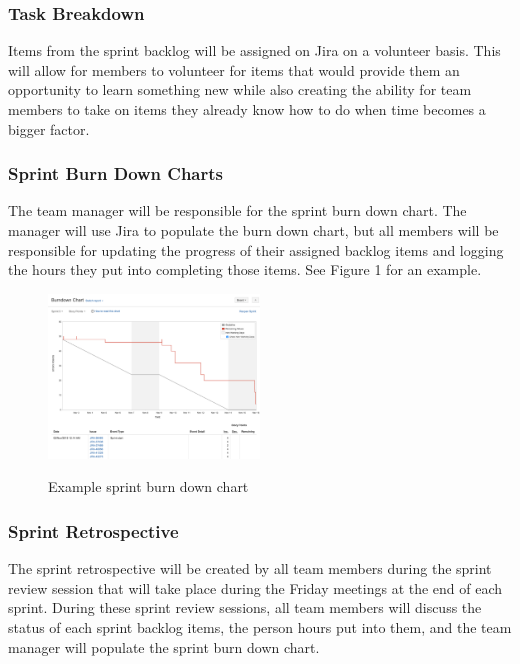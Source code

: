 \subsubsection{Task Breakdown}
Items from the sprint backlog will be assigned on Jira on a volunteer basis. This will allow for members to volunteer for items that would provide them an opportunity to learn something new while also creating the ability for team members to take on items they already know how to do when time becomes a bigger factor.

\subsubsection{Sprint Burn Down Charts}
The team manager will be responsible for the sprint burn down chart. The manager will use Jira to populate the burn down chart, but all members will be responsible for updating the progress of their assigned backlog items and logging the hours they put into completing those items. See Figure 1 for an example.

\begin{figure}
    \centering
    \includegraphics[width=0.5\textwidth]{images/burndown}\\
    \caption{Example sprint burn down chart}
\end{figure}

\subsubsection{Sprint Retrospective}
The sprint retrospective will be created by all team members during the sprint review session that will take place during the Friday meetings at the end of each sprint. During these sprint review sessions, all team members will discuss the status of each sprint backlog items, the person hours put into them, and the team manager will populate the sprint burn down chart.

